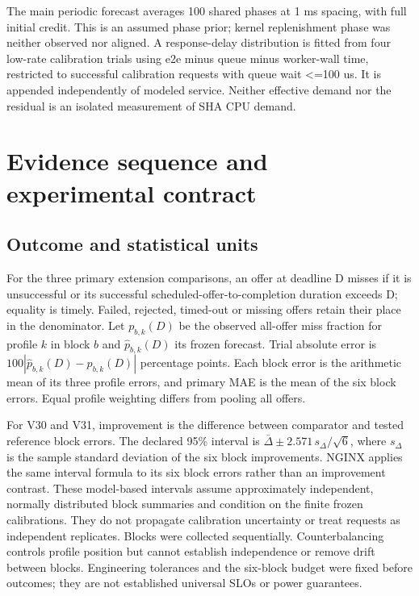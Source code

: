 \documentclass[11pt,a4paper]{article}
\begin{document}
The main periodic forecast averages 100 shared phases at 1 ms spacing, with
full initial credit. This is an assumed phase prior; kernel replenishment phase
was neither observed nor aligned. A response-delay distribution is fitted
from four low-rate calibration trials using e2e minus queue minus worker-wall
time, restricted to successful calibration requests with queue wait <=100 us.
It is appended independently of modeled service. Neither effective demand nor
the residual is an isolated measurement of SHA CPU demand.

\section{Evidence sequence and experimental contract}

\subsection{Outcome and statistical units}

For the three primary extension comparisons, an offer at deadline D misses if
it is unsuccessful or its successful
scheduled-offer-to-completion duration exceeds D; equality is timely. Failed,
rejected, timed-out or missing offers retain their place in the denominator.
Let $p_{b,k}(D)$ be the observed all-offer miss fraction for profile $k$ in block $b$
and $\hat p_{b,k}(D)$ its frozen forecast. Trial absolute error is
$100\left|\hat p_{b,k}(D)-p_{b,k}(D)\right|$ percentage points. Each block error is the
arithmetic mean of its three profile errors, and primary MAE is the mean of
the six block errors. Equal profile weighting differs from pooling all offers.

For V30 and V31, improvement is the difference between comparator and tested
reference block errors. The declared 95\% interval is
$\bar\Delta \pm 2.571\,s_\Delta/\sqrt{6}$, where $s_\Delta$ is the sample
standard deviation of the six block improvements. NGINX applies the same interval
formula to its six block errors rather than an improvement contrast. These
model-based intervals assume approximately independent, normally distributed
block summaries and condition on the finite frozen calibrations. They do not
propagate calibration uncertainty or treat requests as independent replicates.
Blocks were collected sequentially. Counterbalancing controls profile position
but cannot establish independence or remove drift between blocks.
Engineering tolerances and the six-block budget were fixed before outcomes;
they are not established universal SLOs or power guarantees.
\end{document}
